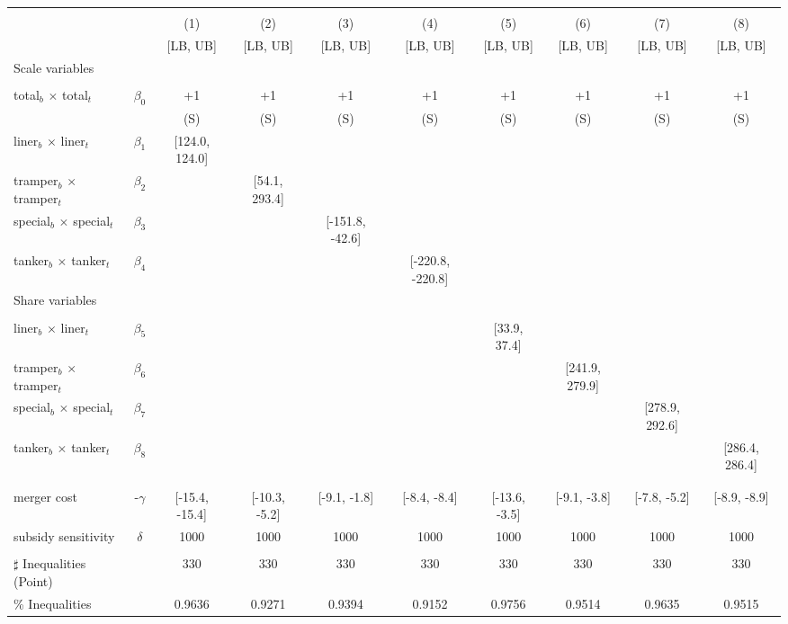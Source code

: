 \begin{tabular}{@{\extracolsep{5pt}}lccccccccc}
\toprule 
 &  &  &  &  &  &  &  &  &  \\
 &  & (1) & (2) & (3) & (4) & (5) & (6) & (7) & (8) \\
 &  & [LB, UB] & [LB, UB] & [LB, UB] & [LB, UB] & [LB, UB] & [LB, UB] & [LB, UB] & [LB, UB] \\
\midrule 
Scale variables &  &  &  &  &  &  &  \\
 &  &  &  &  &  &  &  &  \\
total$_{b}$ $\times$ total$_{t}$ & $\beta_0$ & +1 & +1 & +1 & +1 & +1 & +1 & +1 & +1 \\
 &  & (S) & (S) & (S) & (S) & (S) & (S) & (S) & (S) \\
liner$_{b}$ $\times$ liner$_{t}$ & $\beta_1$ & [124.0, 124.0] &  &  &  &  &  &  &  \\
tramper$_{b}$ $\times$ tramper$_{t}$ & $\beta_2$ &  & [54.1, 293.4] &  &  &  &  &  &  \\
special$_{b}$ $\times$ special$_{t}$ & $\beta_3$ &  &  & [-151.8, -42.6] &  &  &  &  &  \\
tanker$_{b}$ $\times$ tanker$_{t}$ & $\beta_4$ &  &  &  & [-220.8, -220.8] &  &  &  &  \\
Share variables &  &  &  &  &  &  &  &  &  \\
 &  &  &  &  &  &  &  &  &  \\
liner$_{b}$ $\times$ liner$_{t}$ & $\beta_5$ &  &  &  &  & [33.9, 37.4] &  &  &  \\
tramper$_{b}$ $\times$ tramper$_{t}$ & $\beta_6$ &  &  &  &  &  & [241.9, 279.9] &  &  \\
special$_{b}$ $\times$ special$_{t}$ & $\beta_7$ &  &  &  &  &  &  & [278.9, 292.6] &  \\
tanker$_{b}$ $\times$ tanker$_{t}$ & $\beta_8$ &  &  &  &  &  &  &  & [286.4, 286.4] \\
 &  &  &  &  &  &  &  &  &  \\
 &  &  &  &  &  &  &  &  &  \\
merger cost & -$\gamma$ & [-15.4, -15.4] & [-10.3, -5.2] & [-9.1, -1.8] & [-8.4, -8.4] & [-13.6, -3.5] & [-9.1, -3.8] & [-7.8, -5.2] & [-8.9, -8.9] \\
subsidy sensitivity & $\delta$ & 1000 & 1000 & 1000 & 1000 & 1000 & 1000 & 1000 & 1000 \\
 &  &  &  &  &  &  &  &  &  \\
\hline 
$\sharp$ Inequalities (Point) &  & 330 & 330 & 330 & 330 & 330 & 330 & 330 & 330 \\
\% Inequalities &  & 0.9636 & 0.9271 & 0.9394 & 0.9152 & 0.9756 & 0.9514 & 0.9635 & 0.9515 \\
\bottomrule 
\end{tabular}
